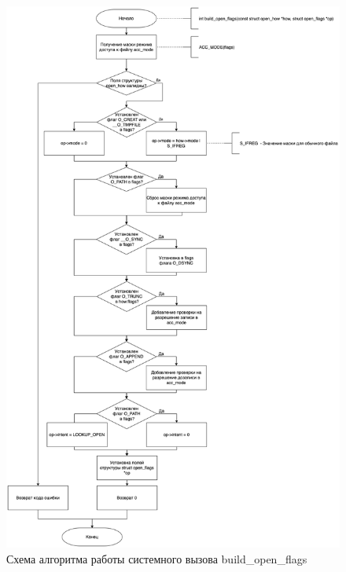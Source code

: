 \documentclass[12pt]{report}
\begin{document}
\begin{figure}[h!]
            \centering
            \includegraphics[scale=0.35]{build_open_flags.png}
            \caption{Схема алгоритма работы системного вызова build\_open\_flags}
            \label{png:testing:result}
\end{figure}
\end{document}
